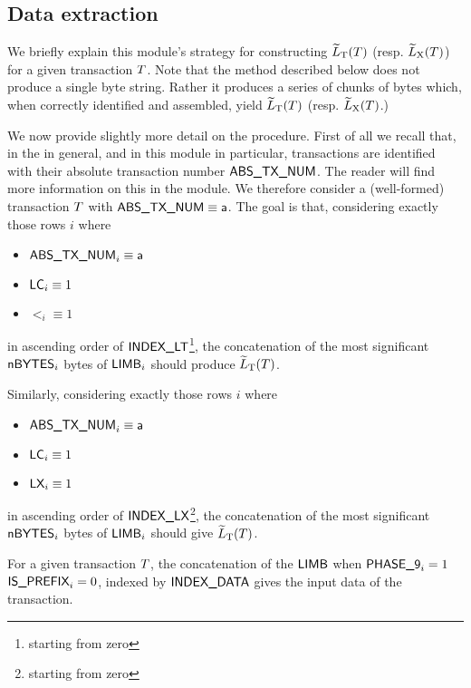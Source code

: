 \subsection{Data extraction}

We briefly explain this module's strategy for constructing $\widetilde{L}_{\mathrm{T}}(T)$ (resp. $\widetilde{L}_{\mathrm{X}}(T)$) for a given transaction $T$.
Note that the method described below does not produce a single byte string.
Rather it produces a series of chunks of bytes which, when correctly identified and assembled, yield $\widetilde{L}_{\mathrm{T}}(T)$ (resp. $\widetilde{L}_{\mathrm{X}}(T)$.)

We now provide slightly more detail on the procedure.
First of all we recall that, in the \zkEvm{} in general, and in this module in particular, transactions are identified with their absolute transaction number $\textsf{ABS\_TX\_NUM}$.
The reader will find more information on this in the \txnDataMod{} module.
We therefore consider a (well-formed) transaction $T$ with $\textsf{ABS\_TX\_NUM} \equiv \textsf{a}$.
The goal is that, considering exactly those rows $i$ where
\begin{multicols}{3}
	\begin{itemize}
		\item $\textsf{ABS\_TX\_NUM}_{i} \equiv \textsf{a}$
		\item $\textsf{LC}_{i} \equiv 1$
		\item $\lt_{i} \equiv 1$
	\end{itemize}
\end{multicols}
\noindent in ascending order of $\textsf{INDEX\_LT}$\footnote{starting from zero},
the concatenation of the most significant 
$\textsf{nBYTES} _{i}$ bytes of $\textsf{LIMB} _{i}$ should produce $\widetilde{L}_{\mathrm{T}}(T)$.

Similarly, considering exactly those rows $i$ where
\begin{multicols}{3}
	\begin{itemize}
		\item $\textsf{ABS\_TX\_NUM}_{i} \equiv \textsf{a}$
		\item $\textsf{LC}_{i} \equiv 1$
		\item $\textsf{LX}_{i} \equiv 1$
	\end{itemize}
\end{multicols}
\noindent in ascending order of $\textsf{INDEX\_LX}$\footnote{starting from zero},
the concatenation of the most significant 
$\textsf{nBYTES} _{i}$ bytes of $\textsf{LIMB} _{i}$ should give $\widetilde{L}_{\mathrm{T}}(T)$.

\saNote{} For a given transaction $T$,
the concatenation of the
$\textsf{LIMB}$ when
$\textsf{PHASE\_9}_{i}=1$ \et{}
$\textsf{IS\_PREFIX}_{i}=0$, indexed by
$\textsf{INDEX\_DATA}$ gives the input data of the transaction.
